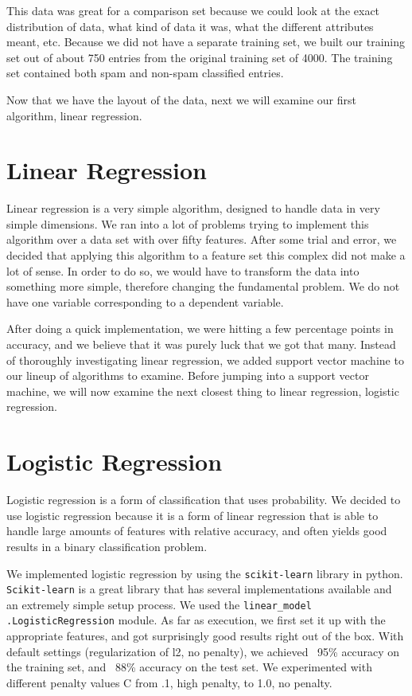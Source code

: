 \documentclass{article} %
\begin{document}
This data was great for a comparison set because we could look at the exact distribution
of data, what kind of data it was, what the different attributes meant, etc. Because we
did not have a separate training set, we built our training set out of about 750 entries
from the original training set of 4000. The training set contained both spam and non-spam
classified entries.

Now that we have the layout of the data, next we will examine our first algorithm,
linear regression.

\section{Linear Regression}
Linear regression is a very simple algorithm, designed to handle data in very simple
dimensions. We ran into a lot of problems trying to implement this algorithm over
a data set with over fifty features. After some trial and error, we decided that
applying this algorithm to a feature set this complex did not make a lot of sense.
In order to do so, we would have to transform the data into something more simple,
therefore changing the fundamental problem. We do not have one variable corresponding
to a dependent variable.

After doing a quick implementation, we were hitting a few percentage points in accuracy,
and we believe that it was purely luck that we got that many. Instead of thoroughly
investigating linear regression, we added support vector machine to our lineup of
algorithms to examine. Before jumping into a support vector machine, we will now
examine the next closest thing to linear regression, logistic regression.

\section{Logistic Regression}
Logistic regression is a form of classification that uses probability. We decided
to use logistic regression because it is a form of linear regression that is able
to handle large amounts of features with relative accuracy, and often yields good
results in a binary classification problem.

We implemented logistic regression by using the \texttt{scikit-learn}\cite{sklearn}
library
in python. \texttt{Scikit-learn} is a great library that has several implementations
available and an extremely simple setup process. We used the \texttt{linear\_model}
\texttt{.LogisticRegression} module. As far as execution, we first set it up with
the appropriate features, and got surprisingly good results right out of the box.
With default settings (regularization of l2, no penalty), we achieved
~95\% accuracy on the training set, and ~88\% accuracy on the test set. We
experimented with different penalty values C from .1, high penalty,
to 1.0, no penalty.
\end{document}
